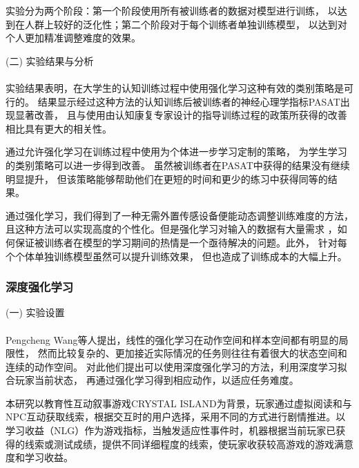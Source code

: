 \documentclass{article}
\begin{document}
            实验分为两个阶段：第一个阶段使用所有被训练者的数据对模型进行训练，
            以达到在人群上较好的泛化性；第二个阶段对于每个训练者单独训练模型，
            以达到对个人更加精准调整难度的效果。

            (二) 实验结果与分析\paragraph{}
            实验结果表明，在大学生的认知训练过程中使用强化学习这种有效的类别策略是可行的。
            结果显示经过这种方法的认知训练后被训练者的神经心理学指标PASAT出现显著改善，
            且与使用由认知康复专家设计的指导训练过程的政策所获得的改善相比具有更大的相关性。

            通过允许强化学习在训练过程中使用为个体进一步学习定制的策略，
            为学生学习的类别策略可以进一步得到改善。
            虽然被训练者在PASAT中获得的结果没有继续明显提升，
            但该策略能够帮助他们在更短的时间和更少的练习中获得同等的结果。

            通过强化学习，我们得到了一种无需外置传感设备便能动态调整训练难度的方法，
            且这种方法可以实现高度的个性化。但是强化学习对输入的数据有大量需求
            ，如何保证被训练者在模型的学习期间的热情是一个亟待解决的问题。此外，
            针对每个个体单独训练模型虽然可以提升训练效果，
            但也造成了训练成本的大幅上升。

            \subsubsection{深度强化学习}
            (一) 实验设置\paragraph{}
            Pengcheng Wang\cite{ref13}等人提出，线性的强化学习在动作空间和样本空间都有明显的局限性，
            然而比较复杂的、更加接近实际情况的任务则往往有着很大的状态空间和连续的动作空间。
            对此他们提出可以使用深度强化学习的方法，利用深度学习拟合玩家当前状态，
            再通过强化学习得到相应动作，以适应任务难度。

            本研究以教育性互动叙事游戏CRYSTAL ISLAND为背景，玩家通过虚拟阅读和与NPC互动获取线索，根据交互时的用户选择，采用不同的方式进行剧情推进。以学习收益（NLG）作为游戏指标，当触发适应性事件时，机器根据当前玩家已获得的线索或测试成绩，提供不同详细程度的线索，使玩家收获较高游戏的游戏满意度和学习收益。
            
\end{document}
